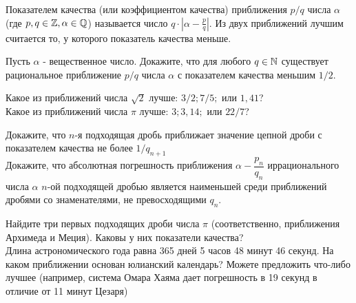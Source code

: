 \documentclass[a4paper,12pt]{article}
\begin{document}
   Показателем качества (или коэффициентом качества) приближения $p/q$ числа   $\alpha$ (где $p,q\in\mathbb{Z},\alpha\in \mathbb{Q}$) называется число   $q\cdot|\alpha-\frac{p}{q}|.$   Из двух приближений лучшим считается то, у которого показатель качества меньше.



   Пусть $\alpha$ - вещественное число. Докажите, что для любого $q\in\mathbb{N}$   существует рациональное приближение $p/q$ числа $\alpha$ с показателем качества меньшим $1/2$.


   Какое из приближений числа $\sqrt{2}$ лучше: $3/2; 7/5;$ или $1,41$?\\
   Какое из приближений числа $\pi$ лучше: $3; 3,14;$ или $22/7$?


    Докажите, что $n$-я подходящая дробь приближает значение цепной дроби   с показателем качества не более $1/q_{n+1}$\\
    Докажите, что абсолютная погрешность приближения $\alpha-\dfrac{p_n}{q_n}$
   иррационального числа $\alpha$ $n$-ой подходящей дробью является наименьшей   среди приближений дробями со знаменателями, не превосходящими $q_n$.




    Найдите три первых подходящих дроби числа $\pi$ (соответственно, приближения   Архимеда и Меция). Каковы у них показатели качества?\\
    Длина астрономического года равна 365 дней 5 часов 48 минут 46 секунд. На каком   приближении основан юлианский календарь? Можете предложить что-либо лучшее   (например, система Омара Хаяма дает погрешность в 19 секунд в отличие от 11 минут Цезаря)


\end{document}
